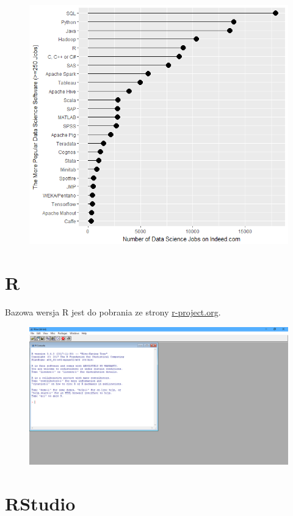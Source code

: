 \documentclass[]{book}
\begin{document}
\begin{figure}
\centering
\includegraphics{img/pop_r1.png}
\caption{}
\end{figure}

\section{R}\label{r}

Bazowa wersja R jest do pobrania ze strony
\href{https://cloud.r-project.org/}{r-project.org}.

\begin{figure}
\centering
\includegraphics{img/r.png}
\caption{}
\end{figure}

\section{RStudio}\label{rstudio}
\end{document}
